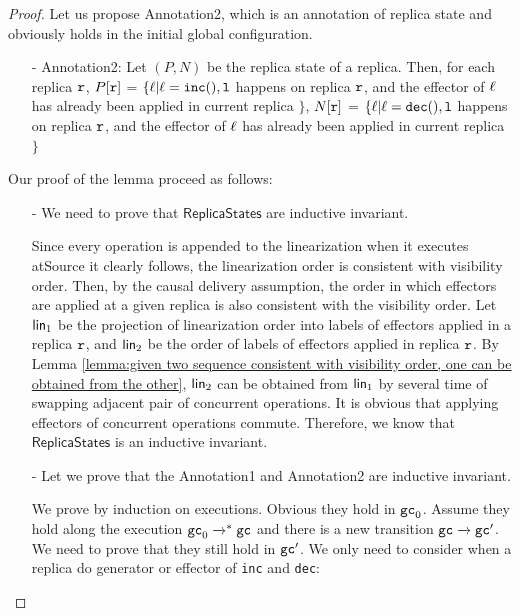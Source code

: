 \begin {proof}
Let us propose Annotation2, which is an annotation of replica state and obviously holds in the initial global configuration.

\begin{itemize}
\setlength{\itemsep}{0.5pt}
\item[-] Annotation2: Let $(P,N)$ be the replica state of a replica. Then, for each replica $\mathtt{r}$, $P[\mathtt{r}]$ =  $\{ \alabel \vert \alabel = \alabelshort[{\tt inc}]{}, l$ happens on replica $\mathtt{r}$, and the effector of $\ell$ has already been applied in current replica $\}$,
    $N[\mathtt{r}]$ =  $\{ \alabel \vert \alabel = \alabelshort[{\tt dec}]{}, l$ happens on replica $\mathtt{r}$, and the effector of $\ell$ has already been applied in current replica $\}$
\end{itemize}

Our proof of the lemma proceed as follows:

\begin{itemize}
\setlength{\itemsep}{0.5pt}
\item[-] We need to prove that $\mathsf{ReplicaStates}$ are inductive invariant.

Since every operation is appended to the linearization when it executes atSource it clearly follows, the linearization order is consistent with visibility order. Then, by the causal delivery assumption, the order in which effectors are applied at a given replica is also consistent with the visibility order. Let $\mathsf{lin}_1$ be the projection of linearization order into labels of effectors applied in a replica $\mathtt{r}$, and $\mathsf{lin}_2$ be the order of labels of effectors applied in replica $\mathtt{r}$. By Lemma \ref{lemma:given two sequence consistent with visibility order, one can be obtained from the other}, $\mathsf{lin}_2$ can be obtained from $\mathsf{lin}_1$ by several time of swapping adjacent pair of concurrent operations. It is obvious that applying effectors of concurrent operations commute. Therefore, we know that $\mathsf{ReplicaStates}$ is an inductive invariant.


\item[-] Let we prove that the Annotation1 and Annotation2 are inductive invariant.

We prove by induction on executions. Obvious they hold in $\mathtt{gc}_0$. Assume they hold along the execution $\mathtt{gc}_0 \xrightarrow{}^* \mathtt{gc}$ and there is a new transition $\mathtt{gc} \xrightarrow{} \mathtt{gc}'$. We need to prove that they still hold in $\mathtt{gc}'$. We only need to consider when a replica do generator or effector of {\tt inc} and {\tt dec}:


\end{itemize}
\end{proof}

